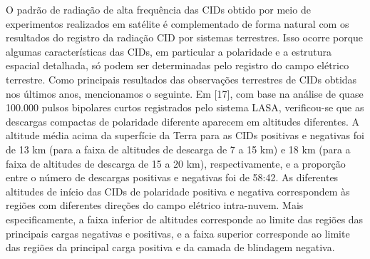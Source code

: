 \documentclass[a4paper, 12pt, onecolumn,singlespacing]{article}
\begin{document}
	O padrão de radiação de alta frequência das CIDs obtido por meio de experimentos realizados em satélite é complementado de forma natural com os resultados do registro da radiação CID por sistemas terrestres. Isso ocorre porque algumas características das CIDs, em particular a polaridade e a estrutura espacial detalhada, só podem ser determinadas pelo registro do campo elétrico terrestre. Como principais resultados das observações terrestres de CIDs obtidas nos últimos anos, mencionamos o seguinte. Em [17], com base na análise de quase 100.000 pulsos bipolares curtos registrados pelo sistema LASA, verificou-se que as descargas compactas de polaridade diferente aparecem em altitudes diferentes. A altitude média acima da superfície da Terra para as CIDs positivas e negativas foi de 13 km (para a faixa de altitudes de descarga de 7 a 15 km) e 18 km (para a faixa de altitudes de descarga de 15 a 20 km), respectivamente, e a proporção entre o número de descargas positivas e negativas foi de 58:42. As diferentes altitudes de início das CIDs de polaridade positiva e negativa correspondem às regiões com diferentes direções do campo elétrico intra-nuvem. Mais especificamente, a faixa inferior de altitudes corresponde ao limite das regiões das principais cargas negativas e positivas, e a faixa superior corresponde ao limite das regiões da principal carga positiva e da camada de blindagem negativa.
	
\end{document}
